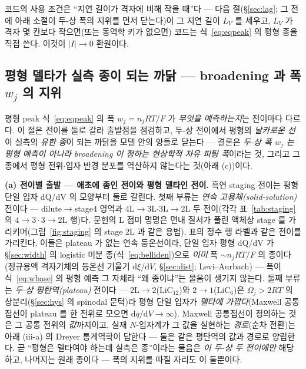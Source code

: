\documentclass[11pt,a4paper]{article}
\newcommand{\dd}{\mathrm{d}}
\begin{document}
코드의 사용 조건은 ``지연 길이가 격자에 비해 작을 때''다 — 다음 절(\S\ref{sec:lag}; 그 전에 아래 소절이
두-상 폭의 지위를 먼저 닫는다)이 그 지연 길이 $L_V$ 를 세우고, $L_V$ 가 격자
몇 칸보다 작으면(또는 동역학 키가 없으면) 코드는 식~\eqref{eq:eqpeak} 의 평형 종을 직접 쓴다. 이것이 $|I|\to0$ 환원이다.

\subsection{평형 델타가 실측 종이 되는 까닭 — broadening 과 폭 $w_j$ 의 지위}\label{sec:broadening}
평형 peak 식~\eqref{eq:eqpeak} 의 폭 $w_j=n_jRT/F$ 가 \emph{무엇을 예측하는지}는 전이마다 다르다. 이 절은
전이를 둘로 갈라 출발점을 점검하고, 두-상 전이에서 평형의 \emph{날카로운 선}이 실측의 \emph{유한 종}이 되는
까닭을 모델 안의 양들로 닫는다 — 결론은 \emph{두-상 폭 $w_j$ 는 평형 예측이 아니라 broadening 이 정하는
현상학적 자유 피팅 폭}이라는 것, 그리고 그 종에서 평형 전위$\cdot$입자 반경 분포를 역산하지 않는다는
것(아래 (c))이다.

\textbf{(a) 전이별 출발 — 애초에 종인 전이와 평형 델타인 전이.} 흑연 staging 전이는 평형 단일 입자 dQ/dV 의 모양부터
둘로 갈린다. 첫째 부류는 \emph{연속 고용체(solid-solution)} 전이다 — dilute$\to$stage4 영역과
4L$\to$3L$\cdot$3L$\to$2L 두 전이(각각 표~\ref{tab:staging} 의 $4\!\to\!3\cdot3\!\to\!2\mathrm L$ 행)다. 문헌의 L 접미 명명은 면내 질서가 풀린
액체상 stage 를 가리키며(그림~\ref{fig:staging} 의 stage 2L 과 같은 용법), 표의 정수 행 라벨과 같은 전이를
가리킨다. 이들은 plateau 가 없는 연속 등온선이라\cite{rsc2021}, 단일 입자 평형 dQ/dV 가 \S\ref{sec:width} 의 logistic 미분
종(식~\eqref{eq:belliden})으로 \emph{이미} 폭 $\sim n_jRT/F$ 의 종이다(정규용액 격자기체의 등온선 기울기
$\dd\xi/\dd V$, \S\ref{sec:dist}; Levi--Aurbach\cite{leviaurbach1999}) — 폭이 식~\eqref{eq:wbase} 의 평형
예측 그 자체라 ``왜 종이냐''는 물음이 생기지 않는다. 둘째 부류는 \emph{두-상 평탄역(plateau)} 전이다 —
$2\mathrm L\!\to\!2$($\mathrm{LiC_{12}}$)와 $2\!\to\!1$($\mathrm{LiC_6}$)은 $\Omega_j>2RT$ 의 상분리(\S\ref{sec:hys}
의 spinodal 문턱)라 평형 단일 입자가 \emph{델타에 가깝다}(Maxwell 공통접선이 plateau 를 한 전위로 모으면
$\dd q/\dd V\!\to\!\infty$). Maxwell 공통접선이 정의하는 것은 그 공통 전위의 \emph{값}까지이고, 실재 $N$-입자계가
그 값을 실현하는 \emph{경로}(순차 전환)는 아래 (iii-a) 의 Dreyer 통계역학이 답한다 — 둘은 같은 평탄역의 값과
경로로 양립한다. 곧 ``평형은 델타여야 하는데 실측은 종''이라는 물음은 \emph{이 두-상 두 전이에만} 해당하고,
나머지는 원래 종이다 — 폭의 지위를 따질 자리도 이 둘뿐이다.
\end{document}
